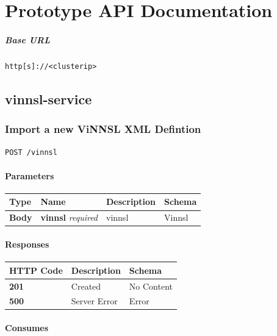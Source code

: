 \chapter{Prototype API Documentation}\label{prototype-api-documentation}

\paragraph{Base URL}\label{base-url}

\begin{verbatim}
http[s]://<clusterip>
\end{verbatim}

\section{vinnsl-service}\label{vinnsl-service-2}

\subsection{Import a new ViNNSL XML
Defintion}\label{import-a-new-vinnsl-xml-defintion}

\begin{verbatim}
POST /vinnsl
\end{verbatim}

\subsubsection{Parameters}\label{parameters}

\begin{longtable}[]{@{}llll@{}}
\toprule
Type & Name & Description & Schema\tabularnewline
\midrule
\endhead
\textbf{Body} & \textbf{vinnsl} \emph{required} & vinnsl &
Vinnsl\tabularnewline
\bottomrule
\end{longtable}

\subsubsection{Responses}\label{responses}

\begin{longtable}[]{@{}lll@{}}
\toprule
HTTP Code & Description & Schema\tabularnewline
\midrule
\endhead
\textbf{201} & Created & No Content\tabularnewline
\textbf{500} & Server Error & Error\tabularnewline
\bottomrule
\end{longtable}

\subsubsection{Consumes}\label{consumes}

